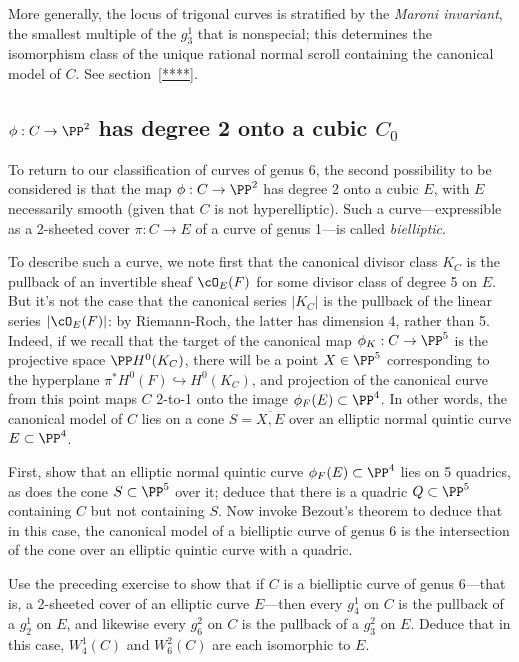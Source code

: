 More generally, the locus of trigonal curves is stratified by  the \emph{Maroni invariant}, the smallest multiple  of the $g^1_3$ that is nonspecial; this determines the isomorphism class of the unique rational normal scroll containing the canonical model of $C$. See section~\ref{****}. 

\subsection{$\phi : C \to \PP^2$ has degree 2 onto a cubic $C_0$}

To return to our classification of curves of genus 6, the second possibility to be considered is that the map $\phi : C \to \PP^2$ has degree 2 onto a cubic $E$, with $E$ necessarily smooth (given that $C$ is not hyperelliptic). Such a curve---expressible as a 2-sheeted cover $\pi : C \to E$ of a curve of genus 1---is called \emph{bielliptic}.

To describe such a curve, we note first that the canonical divisor class $K_C$ is the pullback of an invertible sheaf $\cO_E(F)$ for some divisor class of degree 5 on $E$. But it's not the case that the canonical series $|K_C|$ is the pullback of the linear series $|\cO_E(F)|$: by Riemann-Roch, the latter has dimension 4, rather than 5. Indeed, if we recall that the target of the canonical map $\phi_K : C \to \PP^5$ is the projective space $\PP H^0(K_C)$, there will be a point $X \in \PP^5$ corresponding to the hyperplane $\pi^*H^0(F) \hookrightarrow H^0(K_C)$, and projection of the canonical curve from this point maps $C$ 2-to-1 onto the image $\phi_F(E) \subset \PP^4$. In other words, the canonical model of $C$ lies on a cone $S = \overline{X, E}$ over an elliptic normal quintic curve $E \subset \PP^4$.

\begin{exercise}
First, show that an elliptic normal quintic curve $\phi_F(E) \subset \PP^4$ lies on 5 quadrics, as does the cone $S \subset \PP^5$ over it; deduce that there is a quadric $Q \subset \PP^5$ containing $C$ but not containing $S$. Now invoke Bezout's theorem to deduce that in this case, the canonical model of a bielliptic curve of genus 6 is the intersection of the cone over an elliptic quintic curve with a quadric.
\end{exercise}


\begin{exercise}
Use the preceding exercise to show that if $C$ is a bielliptic curve of genus 6---that is, a 2-sheeted cover of an elliptic curve $E$---then every $g^1_4$ on $C$ is the pullback of a $g^1_2$ on $E$, and likewise  every $g^2_6$ on $C$ is the pullback of a $g^2_3$ on $E$. Deduce that in this case, $W^1_4(C)$ and $W^2_6(C)$ are each isomorphic to $E$.
\end{exercise}

